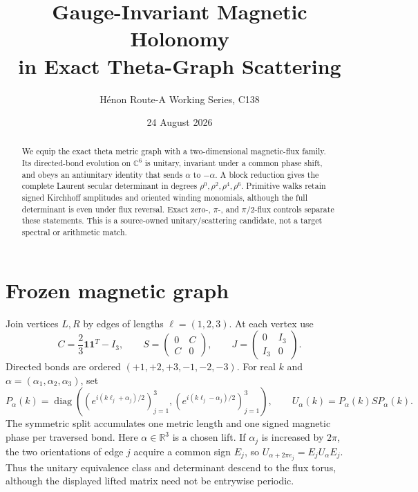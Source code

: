 \documentclass[11pt]{article}
\title{Gauge-Invariant Magnetic Holonomy\\in Exact Theta-Graph Scattering}
\author{H\'enon Route-A Working Series, C138}
\date{24 August 2026}
\begin{document}
\maketitle
\begin{abstract}
We equip the exact theta metric graph with a two-dimensional magnetic-flux
family.  Its directed-bond evolution on $\mathbb C^6$ is unitary, invariant
under a common phase shift, and obeys an antiunitary identity that sends
$\alpha$ to $-\alpha$.  A block reduction gives the complete Laurent secular
determinant in degrees $\rho^0,\rho^2,\rho^4,\rho^6$.  Primitive walks retain
signed Kirchhoff amplitudes and oriented winding monomials, although the full
determinant is even under flux reversal.  Exact zero-, $\pi$-, and
$\pi/2$-flux controls separate these statements.  This is a source-owned
unitary/scattering candidate, not a target spectral or arithmetic match.
\end{abstract}

\section{Frozen magnetic graph}
Join vertices $L,R$ by edges of lengths $\ell=(1,2,3)$.  At each vertex use
\[
 C=\frac23\mathbf1\mathbf1^T-I_3,\qquad
 S=\begin{pmatrix}0&C\\C&0\end{pmatrix},\qquad
 J=\begin{pmatrix}0&I_3\\I_3&0\end{pmatrix}.
\]
Directed bonds are ordered $(+1,+2,+3,-1,-2,-3)$.  For real $k$ and
$\alpha=(\alpha_1,\alpha_2,\alpha_3)$, set
\[
 P_\alpha(k)=\operatorname{diag}\left(
 (e^{i(k\ell_j+\alpha_j)/2})_{j=1}^3,
 (e^{i(k\ell_j-\alpha_j)/2})_{j=1}^3\right),
 \qquad U_\alpha(k)=P_\alpha(k)SP_\alpha(k).
\]
The symmetric split accumulates one metric length and one signed magnetic
phase per traversed bond.  Here $\alpha\in\mathbb R^3$ is a chosen lift.
If $\alpha_j$ is increased by $2\pi$, the two orientations of edge $j$
acquire a common sign $E_j$, so $U_{\alpha+2\pi e_j}=E_jU_\alpha E_j$.
Thus the unitary equivalence class and determinant descend to the flux torus,
although the displayed lifted matrix need not be entrywise periodic.
\end{document}
